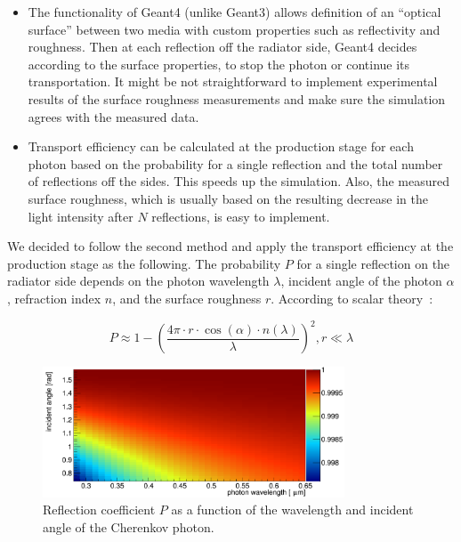 \begin{itemize}
\item The functionality of Geant4 (unlike Geant3) allows definition of an ``optical surface'' between two media with custom properties such as reflectivity and roughness. Then at each reflection off the radiator side, Geant4 decides according to the surface properties, to stop the photon or continue its transportation. It might be not straightforward to implement experimental results of the surface roughness measurements and make sure the simulation agrees with the measured data.
\item Transport efficiency can be calculated at the production stage for each photon based on the probability for a single reflection and the total number of reflections off the sides. This speeds up the simulation. Also, the measured surface roughness, which is usually based on the resulting decrease in the light intensity after $N$ reflections, is easy to implement.
\end{itemize}

We decided to follow the second method and apply the transport efficiency at the production stage as the following. The probability $P$ for a single reflection on the radiator side depends on the photon wavelength $\lambda$, incident angle of the photon $\alpha$, refraction index $n$, and the surface roughness $r$. According to scalar theory~\cite{scalar}:

\begin{equation}
P \approx  1 - \left( \frac{4\pi \cdot r \cdot \cos(\alpha) \cdot n(\lambda)}{\lambda} \right)^{2}, r \ll \lambda
\end{equation}

\begin{figure}[!h]
\centering
\includegraphics[width=0.8\textwidth]{pics/psurf.png}
\caption{\label{pic:sur}
Reflection coefficient $P$ as a function of the wavelength and incident angle of the Cherenkov photon.
}
\end{figure}

